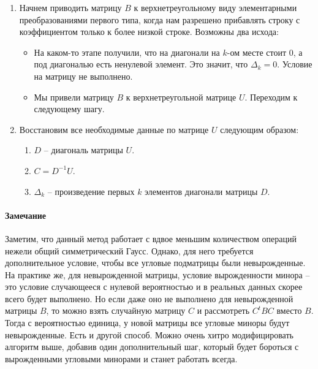 \begin{enumerate}
\item Начнем приводить матрицу $B$ к верхнетреугольному виду элементарными преобразованиями первого типа, когда нам разрешено прибавлять строку с коэффициентом только к более низкой строке.
Возможны два исхода:
\begin{itemize}
\item На каком-то этапе получили, что на диагонали на $k$-ом месте стоит $0$, а под диагональю есть ненулевой элемент.
Это значит, что $\Delta_k = 0$.
Условие на матрицу не выполнено.

\item Мы привели матрицу $B$ к верхнетреугольной матрице $U$.
Переходим к следующему шагу.
\end{itemize}

\item Восстановим все необходимые данные по матрице $U$ следующим образом:
\begin{enumerate}
\item $D$ -- диагональ матрицы $U$.

\item $C =  D^{-1}U$.

\item $\Delta_k$ -- произведение первых $k$ элементов диагонали матрицы $D$.
\end{enumerate}
\end{enumerate}

\paragraph{Замечание}

Заметим, что данный метод работает с вдвое меньшим количеством операций нежели общий симметрический Гаусс.
Однако, для него требуется дополнительное условие, чтобы все  угловые подматрицы были невырожденные.
На практике же, для невырожденной матрицы, условие вырожденности минора -- это условие случающееся с нулевой вероятностью и в реальных данных скорее всего будет выполнено.
Но если даже оно не выполнено для невырожденной матрицы $B$, то можно взять случайную матрицу $C$ и рассмотреть $C^tBC$ вместо $B$.
Тогда с вероятностью единица, у новой матрицы все угловые миноры будут невырожденные.
Есть и другой способ.
Можно очень хитро модифицировать алгоритм выше, добавив один дополнительный шаг, который будет бороться с вырожденными угловыми минорами и станет работать всегда.
